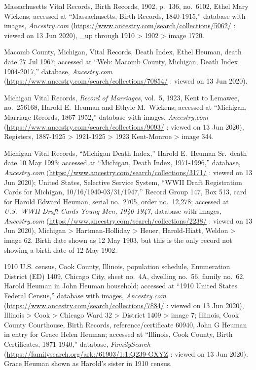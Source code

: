 \begin{thebibliography}{999}

Massachusetts Vital Records, Birth Records, 1902, p.\ 136, no.\ 6102, Ethel Mary Wickens; accessed at ``Massachusetts, Birth Records, 1840-1915,'' database with images, \textit{Ancestry.com} (\url{https://www.ancestry.com/search/collections/5062/} : viewed on 13 Jun 2020), \_up through 1910 > 1902 > image 1720.

Macomb County, Michigan, Vital Records, Death Index, Ethel Heuman, death date 27 Jul 1967; accessed at ``Web: Macomb County, Michigan, Death Index 1904-2017,'' database, \textit{Ancestry.com} (\url{https://www.ancestry.com/search/collections/70854/} : viewed on 13 Jun 2020).

Michigan Vital Records, \textit{Record of Marriages}, vol.\ 5, 1923, Kent to Lemawee, no.\ 256168, Harold E.\ Heuman and Ethyle M.\ Wickens; accessed at ``Michigan, Marriage Records, 1867-1952,'' database with images, \textit{Ancestry.com} (\url{https://www.ancestry.com/search/collections/9093/} : viewed on 13 Jun 2020),  Registers, 1887-1925 > 1921-1925 > 1923 Kent-Monroe > image 344.

Michigan Vital Records, ``Michigan Death Index,'' Harold E.\ Heuman Sr.\, death date 10 May 1993; accessed at ``Michigan, Death Index, 1971-1996,'' database, \textit{Ancestry.com} (\url{https://www.ancestry.com/search/collections/3171/} : viewed on 13 Jun 2020); United States, Selective Service System, ``WWII Draft Registration Cards for Michigan, 10/16/1940-03/31/1947,'' Record Group 147, Box 513, card for Harold Edward Heuman, serial no.\ 2705, order no.\ 12,278; accessed at \textit{U.S.\ WWII Draft Cards Young Men, 1940-1947}, database with images, \textit{Ancestry.com} (\url{https://www.ancestry.com/search/collections/2238/} : viewed on 13 Jun 2020), Michigan > Hartman-Holliday > Heuer, Harold-Hiatt, Weldon > image 62. Birth date shown as 12 May 1903, but this is the only record not showing a birth date of 12 May 1902.

1910 U.S. census, Cook County, Illinois, population schedule, Enumeration District (ED) 1409, Chicago City, sheet no.\ 4A, dwelling no.\ 56, family no.\ 62, Harold Heuman in John Heuman household; accessed at ``1910 United States Federal Census,'' database with images, \textit{Ancestry.com} (\url{https://www.ancestry.com/search/collections/7884/} : viewed on 13 Jun 2020), Illinois > Cook > Chicago Ward 32 > District 1409 > image 7; Illinois, Cook County Courthouse, Birth Records, reference/certificate 60940, John G Heuman in entry for Grace Helen Heuman; accessed at ``Illinois, Cook County, Birth Certificates, 1871-1940,'' database, \textit{FamilySearch} (\url{https://familysearch.org/ark:/61903/1:1:Q239-GXYZ} : viewed on 13 Jun 2020). Grace Heuman shown as Harold's sister in 1910 census.


\end{thebibliography}

